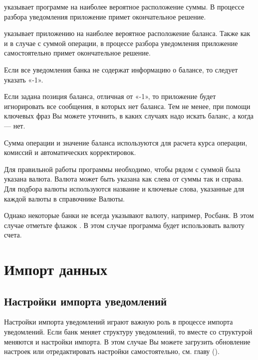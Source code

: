 \documentclass[a4paper,10pt,russian]{sphinxmanual}
\begin{document}
 указывает программе на наиболее вероятное
расположение суммы. В процессе разбора уведомления приложение примет окончательное решение.

 указывает приложению на наиболее вероятное
расположение баланса. Также как и в случае с суммой операции, в процессе разбора уведомления
приложение самостоятельно примет окончательное решение.

Если все уведомления банка не содержат информацию о балансе, то следует указать «-1».

Если задана позиция баланса, отличная от «-1», то приложение будет игнорировать все сообщения, в которых нет баланса.
Тем не менее, при помощи ключевых фраз Вы можете уточнить, в каких случаях надо искать баланс, а когда — нет.

Сумма операции и значение баланса используются для расчета курса операции, комиссий и автоматических корректировок.

Для правильной работы программы необходимо, чтобы рядом с суммой была указана валюта. Валюта может быть указана как
слева от суммы так и справа. Для подбора валюты используются название и ключевые слова, указанные для каждой валюты
в справочнике Валюты.

Однако некоторые банки не всегда указывают валюту, например, Росбанк. В этом случае отметьте флажок
. В этом случае программа будет использовать валюту счета.


\chapter{Импорт данных}
\label{\detokenize{import:chapter-import}}\label{\detokenize{import:id1}}\label{\detokenize{import::doc}}

\section{Настройки импорта уведомлений}
\label{\detokenize{import:id2}}
Настройки импорта уведомлений играют важную роль в процессе импорта уведомлений. Если банк меняет
структуру уведомлений, то вместе со структурой меняются и настройки импорта. В этом случае Вы можете
загрузить обновление настроек или отредактировать настройки самостоятельно, см. главу {\hyperref[\detokenize{notifications:chapter-notifications}]{}} ().
\end{document}
